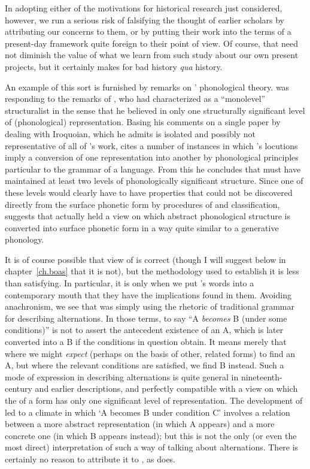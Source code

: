 In adopting either of the motivations for historical research just
considered, however, we run a serious risk of falsifying the thought
of earlier scholars by attributing our concerns to them, or by putting
their work into the terms of a present-day framework quite foreign to
their point of view. Of course, that need not diminish the value of
what we learn from such study about our own present projects, but it
certainly makes for bad history \emph{qua} history.

An example of this sort is furnished by 
remarks on {\Boas}' phonological theory.  {\Postal} was responding to the
remarks of \citet{voegelins63:history}, who had characterized {\Boas} as
a “monolevel” structuralist in the sense that he believed in only one
structurally significant level of (phonological)
representation. Basing his comments on a single paper by {\Boas} dealing
with Iroquoian, which he admits is isolated and possibly not
representative of all of {\Boas}'s work, {\Postal} cites a number of
instances in which {\Boas}'s locutions imply a conversion of one
representation into another by phonological principles particular to
the grammar of a language. From this he concludes that {\Boas} must have
maintained at least two {levels} of phonologically significant
structure. Since one of these {levels} would clearly have to have
properties that could not be discovered directly from the surface
phonetic form by procedures of  and classification, {\Postal}
suggests that {\Boas} actually held a view on which abstract phonological
structure is converted into surface phonetic form in a way quite
similar to a generative phonology.

It is of course possible that  view of {\Boas}
is correct (though I will suggest below in chapter~\ref{ch.boas} that
it is not), but the methodology used to establish it is less than
satisfying. In particular, it is only when we put {\Boas}'s words into a
contemporary mouth that they have the implications {\Postal} found in
them. Avoiding anachronism, we see that {\Boas} was simply using the
rhetoric of traditional grammar for describing alternations. In those
terms, to say “A \emph{becomes} B (under some conditions)” is not to
assert the antecedent existence of an A, which is later converted into
a B if the conditions in question obtain. It means merely that where
we might \emph{expect} (perhaps on the basis of other, related forms)
to find an A, but where the relevant conditions are satisfied, we find
B instead. Such a mode of expression in describing alternations is
quite general in nineteenth-century and earlier descriptions, and
perfectly compatible with a view on which the  of a
form has only one significant level of representation. The development
of  led to a climate in which ‘A becomes B under
condition C' involves a relation between a more abstract
representation (in which A appears) and a more concrete one (in which
B appears instead); but this is not the only (or even the most direct)
interpretation of such a way of talking about alternations. There is
certainly no reason to attribute it to {\Boas}, as {\Postal} does.


